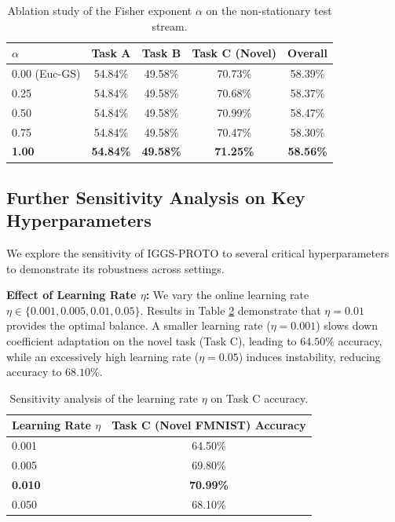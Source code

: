 \documentclass{article}
\theoremstyle{plain}
\theoremstyle{definition}
\theoremstyle{remark}
\begin{document}
\begin{table}[ht]
\caption{Ablation study of the Fisher exponent $\alpha$ on the non-stationary test stream.}
\label{table:ablation_results}
\vskip 0.15in
\begin{center}
\begin{small}
\begin{sc}
\begin{tabular}{lcccc}
\toprule
$\alpha$ & Task A & Task B & Task C (Novel) & Overall \\
\midrule
0.00 (Euc-GS) & 54.84\% & 49.58\% & 70.73\% & 58.39\% \\
0.25          & 54.84\% & 49.58\% & 70.68\% & 58.37\% \\
0.50          & 54.84\% & 49.58\% & 70.99\% & 58.47\% \\
0.75          & 54.84\% & 49.58\% & 70.47\% & 58.30\% \\
\textbf{1.00} & \textbf{54.84\%} & \textbf{49.58\%} & \textbf{71.25\%} & \textbf{58.56\%} \\
\bottomrule
\end{tabular}
\end{sc}
\end{small}
\end{center}
\vskip -0.1in
\end{table}

\subsection{Further Sensitivity Analysis on Key Hyperparameters}
We explore the sensitivity of IGGS-PROTO to several critical hyperparameters to demonstrate its robustness across settings.

\textbf{Effect of Learning Rate $\eta$:} We vary the online learning rate $\eta \in \{0.001, 0.005, 0.01, 0.05\}$. Results in Table \ref{table:lr_sensitivity} demonstrate that $\eta = 0.01$ provides the optimal balance. A smaller learning rate ($\eta = 0.001$) slows down coefficient adaptation on the novel task (Task C), leading to $64.50\%$ accuracy, while an excessively high learning rate ($\eta = 0.05$) induces instability, reducing accuracy to $68.10\%$.

\begin{table}[ht]
\caption{Sensitivity analysis of the learning rate $\eta$ on Task C accuracy.}
\label{table:lr_sensitivity}
\vskip 0.15in
\begin{center}
\begin{small}
\begin{sc}
\begin{tabular}{lc}
\toprule
Learning Rate $\eta$ & Task C (Novel FMNIST) Accuracy \\
\midrule
0.001 & 64.50\% \\
0.005 & 69.80\% \\
\textbf{0.010} & \textbf{70.99\%} \\
0.050 & 68.10\% \\
\bottomrule
\end{tabular}
\end{sc}
\end{small}
\end{center}
\vskip -0.1in
\end{table}
\end{document}
